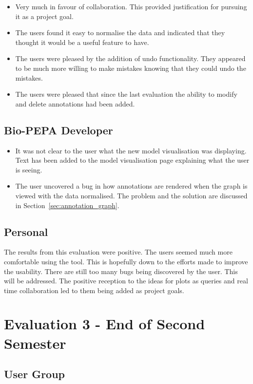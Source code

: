 \begin{itemize}
\item Very much in favour of collaboration. This provided justification for pursuing it as a project goal.
\item The users found it easy to normalise the data and indicated that they thought it would be a useful feature to have.
\item The users were pleased by the addition of undo functionality.  They appeared to be much more willing to make mistakes knowing that they could undo the mistakes.
\item The users were pleased that since the last evaluation the ability to modify and delete annotations had been added.
\end{itemize}

\subsection{Bio-PEPA Developer}

\begin{itemize}
\item It was not clear to the user what the new model visualisation was displaying.  Text has been added to the model visualisation page explaining what the user is seeing.
\item The user uncovered a bug in how annotations are rendered when the graph is viewed with the data normalised.  The problem and the solution are discussed in Section~\ref{sec:annotation_graph}.
\end{itemize}

\subsection{Personal}

The results from this evaluation were positive.  The users seemed much more comfortable using the tool.  This is hopefully down to the efforts made to improve the usability.  There are still too many bugs being discovered by the user.  This will be addressed.  The positive reception to the ideas for plots as queries and real time collaboration led to them being added as project goals.

\section{Evaluation 3 - End of Second Semester}

\subsection{User Group}

